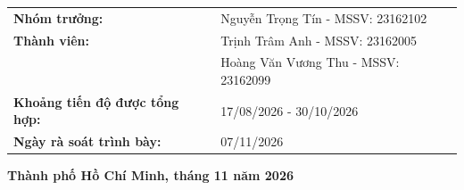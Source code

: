 \documentclass[12pt,a4paper,oneside]{report}
\begin{document}
\begin{titlepage}
\begin{center}
{\begin{tabularx}{0.86\textwidth}{L{6.0cm}Y}
    \textbf{Nhóm trưởng:} & Nguyễn Trọng Tín - MSSV: 23162102 \\
    \textbf{Thành viên:} & Trịnh Trâm Anh - MSSV: 23162005 \\
    & Hoàng Văn Vương Thu - MSSV: 23162099 \\
    \textbf{Khoảng tiến độ được tổng hợp:} & 17/08/2026 - 30/10/2026 \\
    \textbf{Ngày rà soát trình bày:} & 07/11/2026 \\
  \end{tabularx}}
\end{center}
\vfill
\begin{center}{\bfseries Thành phố Hồ Chí Minh, tháng 11 năm 2026}\end{center}
\end{titlepage}
\end{document}
